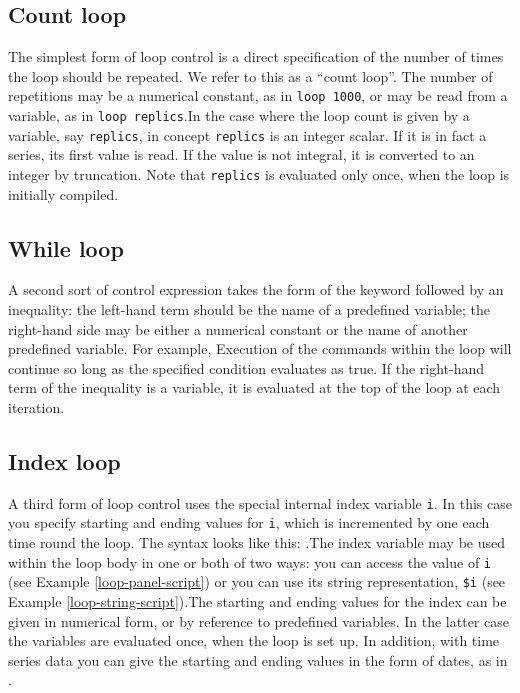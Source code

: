 \subsection{Count loop}
\label{loop-count}

The simplest form of loop control is a direct
	specification of the number of times the loop should be
	repeated.  We refer to this as a ``count loop''.
	The number of repetitions may be a numerical constant, as in
	\verb+loop 1000+, or may be read from a variable,
	as in \verb+loop replics+.In the case where the loop count is given by a variable,
	say \verb+replics+, in concept
	\verb+replics+ is an integer scalar.  If it is in
	fact a series, its first value is read.  If the value is not
	integral, it is converted to an integer by truncation.  Note
	that \verb+replics+ is evaluated only once, when
	the loop is initially compiled.  
      

\subsection{While loop}
\label{loop-while}

A second sort of control expression takes the form of the
	keyword  followed by an inequality:
	the left-hand term should be the name of a predefined
	variable; the right-hand side may be either a numerical
	constant or the name of another predefined variable.  For
	example,
      Execution of the commands within the loop will continue so
	long as the specified condition evaluates as true. If
	the right-hand term of the inequality is a variable, it is
	evaluated at the top of the loop at each iteration.

\subsection{Index loop}
\label{loop-index}

A third form of loop control uses the special internal
	index variable \verb+i+.  In this case you specify
	starting and ending values for \verb+i+, which is
	incremented by one each time round the loop.  The syntax looks
	like this: .The index variable may be used within the loop body in one
	or both of two ways: you can access the value of
	\verb+i+ (see Example \ref{loop-panel-script}) or you can use its string
	representation, \verb+$i+ (see Example \ref{loop-string-script}).The starting and ending values for the index can be given
	in numerical form, or by reference to predefined variables.
	In the latter case the variables are evaluated once, when the
	loop is set up.  In addition, with time series data you can
	give the starting and ending values in the form of dates, as
	in .
      

